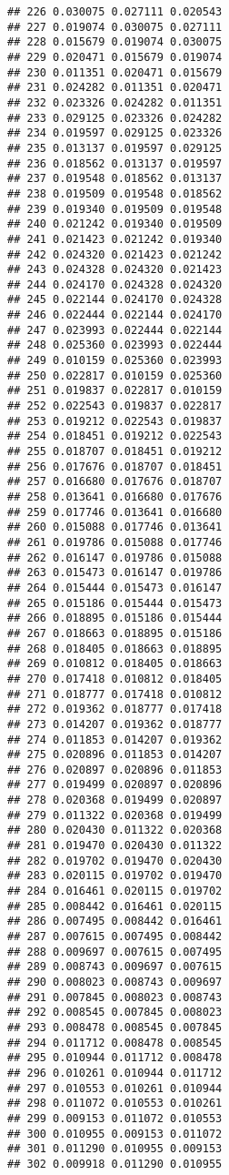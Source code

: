\documentclass[]{article}
\begin{document}
\begin{verbatim}
## 226 0.030075 0.027111 0.020543
## 227 0.019074 0.030075 0.027111
## 228 0.015679 0.019074 0.030075
## 229 0.020471 0.015679 0.019074
## 230 0.011351 0.020471 0.015679
## 231 0.024282 0.011351 0.020471
## 232 0.023326 0.024282 0.011351
## 233 0.029125 0.023326 0.024282
## 234 0.019597 0.029125 0.023326
## 235 0.013137 0.019597 0.029125
## 236 0.018562 0.013137 0.019597
## 237 0.019548 0.018562 0.013137
## 238 0.019509 0.019548 0.018562
## 239 0.019340 0.019509 0.019548
## 240 0.021242 0.019340 0.019509
## 241 0.021423 0.021242 0.019340
## 242 0.024320 0.021423 0.021242
## 243 0.024328 0.024320 0.021423
## 244 0.024170 0.024328 0.024320
## 245 0.022144 0.024170 0.024328
## 246 0.022444 0.022144 0.024170
## 247 0.023993 0.022444 0.022144
## 248 0.025360 0.023993 0.022444
## 249 0.010159 0.025360 0.023993
## 250 0.022817 0.010159 0.025360
## 251 0.019837 0.022817 0.010159
## 252 0.022543 0.019837 0.022817
## 253 0.019212 0.022543 0.019837
## 254 0.018451 0.019212 0.022543
## 255 0.018707 0.018451 0.019212
## 256 0.017676 0.018707 0.018451
## 257 0.016680 0.017676 0.018707
## 258 0.013641 0.016680 0.017676
## 259 0.017746 0.013641 0.016680
## 260 0.015088 0.017746 0.013641
## 261 0.019786 0.015088 0.017746
## 262 0.016147 0.019786 0.015088
## 263 0.015473 0.016147 0.019786
## 264 0.015444 0.015473 0.016147
## 265 0.015186 0.015444 0.015473
## 266 0.018895 0.015186 0.015444
## 267 0.018663 0.018895 0.015186
## 268 0.018405 0.018663 0.018895
## 269 0.010812 0.018405 0.018663
## 270 0.017418 0.010812 0.018405
## 271 0.018777 0.017418 0.010812
## 272 0.019362 0.018777 0.017418
## 273 0.014207 0.019362 0.018777
## 274 0.011853 0.014207 0.019362
## 275 0.020896 0.011853 0.014207
## 276 0.020897 0.020896 0.011853
## 277 0.019499 0.020897 0.020896
## 278 0.020368 0.019499 0.020897
## 279 0.011322 0.020368 0.019499
## 280 0.020430 0.011322 0.020368
## 281 0.019470 0.020430 0.011322
## 282 0.019702 0.019470 0.020430
## 283 0.020115 0.019702 0.019470
## 284 0.016461 0.020115 0.019702
## 285 0.008442 0.016461 0.020115
## 286 0.007495 0.008442 0.016461
## 287 0.007615 0.007495 0.008442
## 288 0.009697 0.007615 0.007495
## 289 0.008743 0.009697 0.007615
## 290 0.008023 0.008743 0.009697
## 291 0.007845 0.008023 0.008743
## 292 0.008545 0.007845 0.008023
## 293 0.008478 0.008545 0.007845
## 294 0.011712 0.008478 0.008545
## 295 0.010944 0.011712 0.008478
## 296 0.010261 0.010944 0.011712
## 297 0.010553 0.010261 0.010944
## 298 0.011072 0.010553 0.010261
## 299 0.009153 0.011072 0.010553
## 300 0.010955 0.009153 0.011072
## 301 0.011290 0.010955 0.009153
## 302 0.009918 0.011290 0.010955

\end{verbatim}
\end{document}
